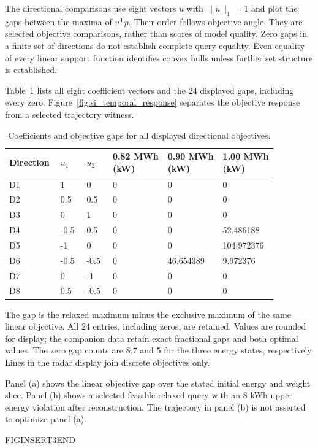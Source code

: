 The directional comparisons use eight vectors $u$ with $\|u\|_1=1$ and plot the gaps between the maxima of $u^\mathsf{T}p$. Their order follows objective angle. They are selected objective comparisons, rather than scores of model quality. Zero gaps in a finite set of directions do not establish complete query equality. Even equality of every linear support function identifies convex hulls unless further set structure is established.

Table~\ref{tab:directions} lists all eight coefficient vectors and the 24 displayed gaps, including every zero. Figure~\ref{fig:si_temporal_response} separates the objective response from a selected trajectory witness.
\begingroup
\begin{longtable}{@{}p{0.12\linewidth}p{0.09\linewidth}p{0.09\linewidth}p{0.19\linewidth}p{0.19\linewidth}p{0.19\linewidth}@{}}
\caption{Coefficients and objective gaps for all displayed directional objectives.}\label{tab:directions}\\
\toprule Direction & $u_1$ & $u_2$ & 0.82 MWh (kW) & 0.90 MWh (kW) & 1.00 MWh (kW)\\
\midrule\bottomrule
D1 & 1 & 0 & 0 & 0 & 0\\
D2 & 0.5 & 0.5 & 0 & 0 & 0\\
D3 & 0 & 1 & 0 & 0 & 0\\
D4 & -0.5 & 0.5 & 0 & 0 & 52.486188\\
D5 & -1 & 0 & 0 & 0 & 104.972376\\
D6 & -0.5 & -0.5 & 0 & 46.654389 & 9.972376\\
D7 & 0 & -1 & 0 & 0 & 0\\
D8 & 0.5 & -0.5 & 0 & 0 & 0\\
\end{longtable}
 The gap is the relaxed maximum minus the exclusive maximum of the same linear objective. All 24 entries, including zeros, are retained. Values are rounded for display; the companion data retain exact fractional gaps and both optimal values. The zero gap counts are 8,7 and 5 for the three energy states, respectively. Lines in the radar display join discrete objectives only.
\endgroup



Panel (a) shows the linear objective gap over the stated initial energy and weight slice. Panel (b) shows a selected feasible relaxed query with an 8 kWh upper energy violation after reconstruction. The trajectory in panel (b) is not asserted to optimize panel (a).

FIGINSERT3END


